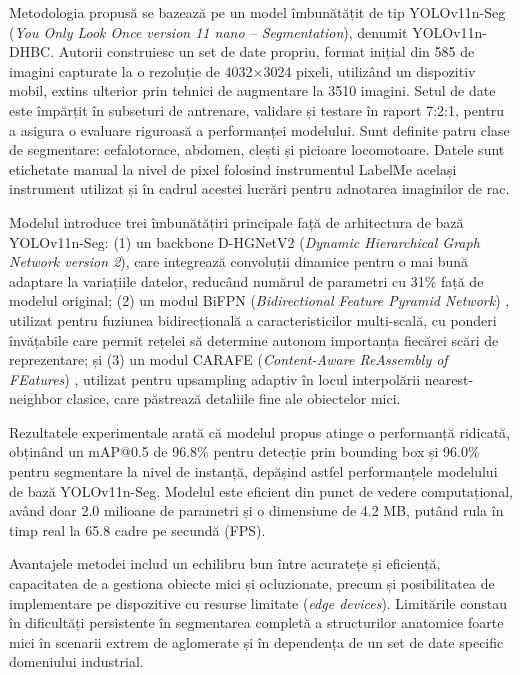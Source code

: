 Metodologia propusă se bazează pe un model îmbunătățit de tip YOLOv11n-Seg (\textit{You Only Look Once version 11 nano -- Segmentation}), denumit YOLOv11n-DHBC. Autorii construiesc un set de date propriu, format inițial din 585 de imagini capturate la o rezoluție de 4032×3024 pixeli, utilizând un dispozitiv mobil, extins ulterior prin tehnici de augmentare la 3510 imagini. Setul de date este împărțit în subseturi de antrenare, validare și testare în raport 7:2:1, pentru a asigura o evaluare riguroasă a performanței modelului. Sunt definite patru clase de segmentare: cefalotorace, abdomen, clești și picioare locomotoare. Datele sunt etichetate manual la nivel de pixel folosind instrumentul LabelMe \cite{labelme} același instrument utilizat și în cadrul acestei lucrări pentru adnotarea imaginilor de rac.

Modelul introduce trei îmbunătățiri principale față de arhitectura de bază YOLOv11n-Seg: (1) un backbone D-HGNetV2 (\textit{Dynamic Hierarchical Graph Network version 2}), care integrează convoluții dinamice pentru o mai bună adaptare la variațiile datelor, reducând numărul de parametri cu 31\% față de modelul original; (2) un modul BiFPN (\textit{Bidirectional Feature Pyramid Network}) \cite{tan2020efficientdet}, utilizat pentru fuziunea bidirecțională a caracteristicilor multi-scală, cu ponderi învățabile care permit rețelei să determine autonom importanța fiecărei scări de reprezentare; și (3) un modul CARAFE (\textit{Content-Aware ReAssembly of FEatures}) \cite{wang2019carafe}, utilizat pentru upsampling adaptiv în locul interpolării nearest-neighbor clasice, care păstrează detaliile fine ale obiectelor mici.

Rezultatele experimentale arată că modelul propus atinge o performanță ridicată, obținând un mAP@0.5 de 96.8\% pentru detecție prin bounding box și 96.0\% pentru segmentare la nivel de instanță, depășind astfel performanțele modelului de bază YOLOv11n-Seg. Modelul este eficient din punct de vedere computațional, având doar 2.0 milioane de parametri și o dimensiune de 4.2 MB, putând rula în timp real la 65.8 cadre pe secundă (FPS).

Avantajele metodei includ un echilibru bun între acuratețe și eficiență, capacitatea de a gestiona obiecte mici și ocluzionate, precum și posibilitatea de implementare pe dispozitive cu resurse limitate (\textit{edge devices}). Limitările constau în dificultăți persistente în segmentarea completă a structurilor anatomice foarte mici în scenarii extrem de aglomerate și în dependența de un set de date specific domeniului industrial.

